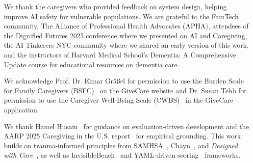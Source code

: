 \documentclass{article}
\begin{document}
We thank the caregivers who provided feedback on system design, helping improve AI safety for vulnerable populations. We are grateful to the FamTech community, The Alliance of Professional Health Advocates (APHA), attendees of the Dignified Futures 2025 conference where we presented on AI and Caregiving, the AI Tinkerers NYC community where we shared an early version of this work, and the instructors of Harvard Medical School's Dementia: A Comprehensive Update course for educational resources on dementia care.

We acknowledge Prof. Dr. Elmar Gr\"a\ss el for permission to use the Burden Scale for Family Caregivers (BSFC)~\cite{graessel2014} on the GiveCare website and Dr. Susan Tebb for permission to use the Caregiver Well-Being Scale (CWBS)~\cite{tebb1995,tebb2013} in the GiveCare application.

We thank Hamel Husain~\cite{husain2024eval} for guidance on evaluation-driven development and the AARP 2025 Caregiving in the U.S. report~\cite{aarp2025} for empirical grounding. This work builds on trauma-informed principles from SAMHSA~\cite{samhsa2014}, Chayn~\cite{chayn2024}, and \textit{Designed with Care}~\cite{edwards2024}, as well as InvisibleBench~\cite{longitudinalbench} and YAML-driven scoring~\cite{yaml-scoring} frameworks.


%
\end{document}
